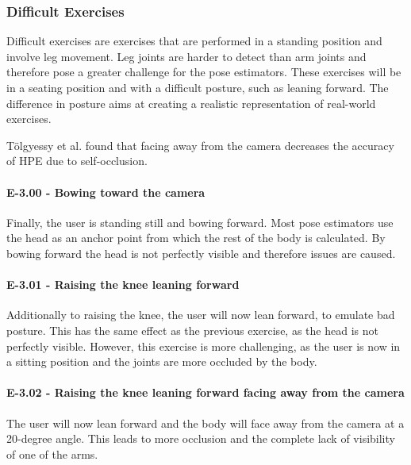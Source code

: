 \subsubsection{Difficult Exercises}

Difficult exercises are exercises that are performed in a standing position and involve leg movement. Leg joints are harder to detect than arm joints and therefore pose a greater challenge for the pose estimators. These exercises will be in a seating position and with a difficult posture, such as leaning forward. The difference in posture aims at creating a realistic representation of real-world exercises.

Tölgyessy et al. found that facing away from the camera decreases the accuracy of HPE due to self-occlusion. \cite{HPEIsHard}

\paragraph{E-3.00 - Bowing toward the camera}

Finally, the user is standing still and bowing forward. Most pose estimators use the head as an anchor point from which the rest of the body is calculated. By bowing forward the head is not perfectly visible and therefore issues are caused.

\paragraph{E-3.01 - Raising the knee leaning forward}

Additionally to raising the knee, the user will now lean forward, to emulate bad posture. This has the same effect as the previous exercise, as the head is not perfectly visible. However, this exercise is more challenging, as the user is now in a sitting position and the joints are more occluded by the body.

\paragraph{E-3.02 - Raising the knee leaning forward facing away from the camera}

The user will now lean forward and the body will face away from the camera at a 20-degree angle. This leads to more occlusion and the complete lack of visibility of one of the arms. 
